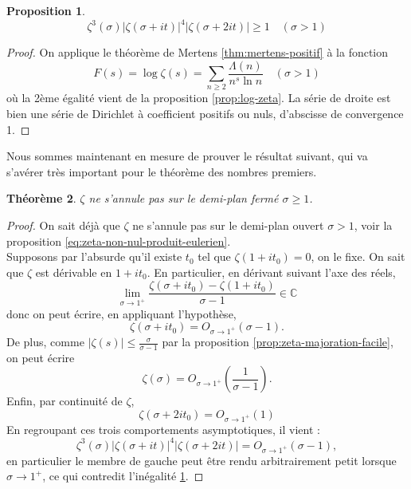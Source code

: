\documentclass[french]{report}
\newtheorem{theorem}{Théorème}[section]
\newtheorem{proposition}[theorem]{Proposition}
\begin{document}
\begin{proposition}\label{prop:zeta-inegalite-1}
  \[ \zeta^3(\sigma)|\zeta(\sigma+it)|^4|\zeta(\sigma+2it)|\geq1\quad(\sigma>1) \]  
\end{proposition}

\begin{proof}
  On applique le théorème de Mertens \ref{thm:mertens-positif} à la fonction
  \[ F(s) = \log\zeta(s) = \sum_{n\geq2}\frac{\Lambda(n)}{n^s\ln n}\quad(\sigma>1) \]
  où la 2ème égalité vient de la proposition \ref{prop:log-zeta}. La série de droite est bien une série de Dirichlet à coefficient positifs ou nuls, d'abscisse de convergence 1.
\end{proof}

Nous sommes maintenant en mesure de prouver le résultat suivant, qui va s'avérer très important pour le théorème des nombres premiers.

\begin{theorem}\label{eq:zeta-non-nul-demi-plan-ferme}
  $\zeta$ ne s'annule pas sur le demi-plan fermé $\sigma\geq1$.
\end{theorem}

\begin{proof}
  On sait déjà que $\zeta$ ne s'annule pas sur le demi-plan ouvert $\sigma>1$, voir la proposition \ref{eq:zeta-non-nul-produit-eulerien}.
  \\

  Supposons par l'absurde qu'il existe $t_0$ tel que $\zeta(1+it_0)=0$, on le fixe. On sait que $\zeta$ est dérivable en $1+it_0$. En particulier, en dérivant suivant l'axe des réels,
  \[ \lim_{\sigma\to1^+}\frac{\zeta(\sigma+it_0)-\zeta(1+it_0)}{\sigma-1}\in\mathbb{C}\]
  donc on peut écrire, en appliquant l'hypothèse,
  \[ \zeta(\sigma+it_0)=O_{\sigma\to1^+}(\sigma-1). \]
  De plus, comme $|\zeta(s)|\leq\frac{\sigma}{\sigma-1}$ par la proposition \ref{prop:zeta-majoration-facile}, on peut écrire
  \[ \zeta(\sigma) = O_{\sigma\to1^+}\left(\frac{1}{\sigma-1}\right). \]
  Enfin, par continuité de $\zeta$,
  \[ \zeta(\sigma+2it_0) = O_{\sigma\to1^+}(1) \]
  En regroupant ces trois comportements asymptotiques, il vient :
  \[ \zeta^3(\sigma)|\zeta(\sigma+it)|^4|\zeta(\sigma+2it)| = O_{\sigma\to1^+}(\sigma-1), \]
  en particulier le membre de gauche peut être rendu arbitrairement petit lorsque $\sigma\to1^+$, ce qui contredit l'inégalité \ref{prop:zeta-inegalite-1}.
\end{proof}

\end{document}
